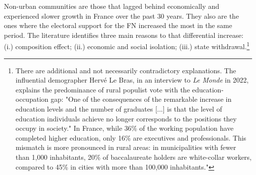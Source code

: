 Non-urban communities are those that lagged behind economically and experienced slower growth in France over the past 30 years. They also are the ones where the electoral support for the FN increased the most in the same period. The literature identifies three main reasons to that differential increase: (i.) composition effect; (ii.) economic and social isolation; (iii.) state withdrawal.\footnote{There are additional and not necessarily contradictory explanations. The influential demographer Hervé Le Bras, in an interview to \textit{Le Monde} in 2022, explains the predominance of rural populist vote with the education-occupation gap: "One of the consequences of the remarkable increase in education levels and the number of graduates [...] is that the level of education individuals achieve no longer corresponds to the positions they occupy in society." In France, while 36\% of the working population have completed higher education, only 16\% are executives and professionals. This mismatch is more pronounced in rural areas: in municipalities with fewer than 1,000 inhabitants, 20\% of baccalaureate holders are white-collar workers, compared to 45\% in cities with more than 100,000 inhabitants."}

